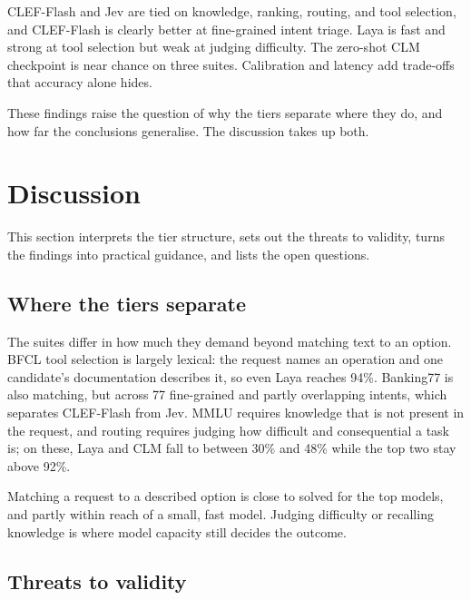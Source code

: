 \documentclass[11pt,a4paper]{article}
\begin{document}
\begin{conclusionbox}
CLEF-Flash and Jev are tied on knowledge, ranking, routing, and tool selection, and CLEF-Flash is
clearly better at fine-grained intent triage. Laya is fast and strong at tool selection but weak at
judging difficulty. The zero-shot CLM checkpoint is near chance on three suites. Calibration and latency
add trade-offs that accuracy alone hides.
\end{conclusionbox}

These findings raise the question of why the tiers separate where they do, and how far the conclusions
generalise. The discussion takes up both.

\section{Discussion}\label{sec:discussion}

This section interprets the tier structure, sets out the threats to validity, turns the findings into
practical guidance, and lists the open questions.

\subsection{Where the tiers separate}\label{sec:interpretation}

The suites differ in how much they demand beyond matching text to an option. BFCL tool selection is
largely lexical: the request names an operation and one candidate's documentation describes it, so even
Laya reaches 94\%. Banking77 is also matching, but across 77 fine-grained and partly overlapping intents,
which separates CLEF-Flash from Jev. MMLU requires knowledge that is not present in the request, and
routing requires judging how difficult and consequential a task is; on these, Laya and CLM fall to
between 30\% and 48\% while the top two stay above 92\%.

\begin{insightbox}
Matching a request to a described option is close to solved for the top models, and partly within reach
of a small, fast model. Judging difficulty or recalling knowledge is where model capacity still decides
the outcome.
\end{insightbox}

\subsection{Threats to validity}\label{sec:threats}
\end{document}

